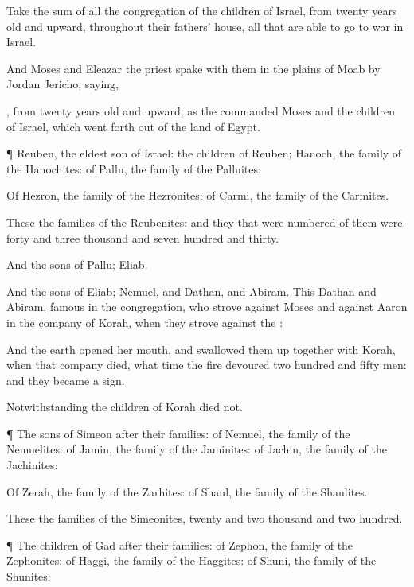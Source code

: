 {Take the
sum of all the
congregation of the
children of
Israel, from
twenty
years
old and
upward, throughout their
fathers’
house, all that are able to
go to
war in
Israel.

And
Moses and
Eleazar the
priest
spake with them in the
plains of
Moab by
Jordan
{}
Jericho,
saying,

, from
twenty
years
old and
upward; as the
{}
commanded
Moses and the
children of
Israel, which went
forth out of the
land of
Egypt.


\par }{\PP {}¶
Reuben, the
eldest son of
Israel: the
children of
Reuben;
Hanoch,
{} the
family of the
Hanochites: of
Pallu, the
family of the
Palluites:

Of
Hezron, the
family of the
Hezronites: of
Carmi, the
family of the
Carmites.

These
{} the
families of the
Reubenites: and they that were
numbered of them were
forty and
three
thousand and
seven
hundred and
thirty.

And the
sons of
Pallu;
Eliab.

And the
sons of
Eliab;
Nemuel, and
Dathan, and
Abiram. This
{}
Dathan and
Abiram,
{}
famous in the
congregation, who
strove against
Moses and against
Aaron in the
company of
Korah, when they
strove against the
{}:

And the
earth
opened her
mouth, and swallowed them
up together with
Korah, when that
company
died, what time the
fire
devoured two
hundred and
fifty
men: and they became a
sign.

Notwithstanding the
children of
Korah
died not.


\par }{\PP {}¶ The
sons of
Simeon after their
families: of
Nemuel, the
family of the
Nemuelites: of
Jamin, the
family of the
Jaminites: of
Jachin, the
family of the
Jachinites:

Of
Zerah, the
family of the
Zarhites: of
Shaul, the
family of the
Shaulites.

These
{} the
families of the
Simeonites,
twenty and
two
thousand and two
hundred.


\par }{\PP {}¶ The
children of
Gad after their
families: of
Zephon, the
family of the
Zephonites: of
Haggi, the
family of the
Haggites: of
Shuni, the
family of the
Shunites:

}
